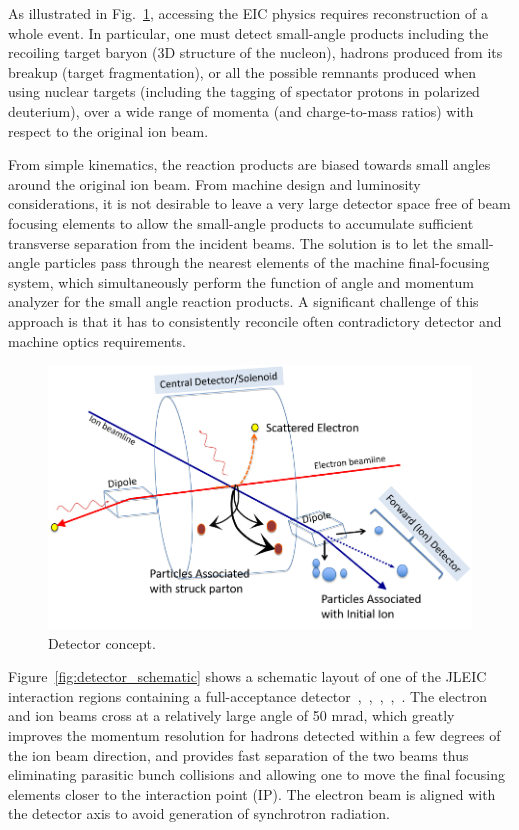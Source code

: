 As illustrated in Fig.~\ref{fig:detector_concept}, accessing the EIC physics requires reconstruction of a whole event. In particular, one must detect small-angle products including the recoiling target baryon (3D structure of the nucleon), hadrons produced from its breakup (target fragmentation), or all the possible remnants produced when using nuclear targets (including the tagging of spectator protons in polarized deuterium), over a wide range of momenta (and charge-to-mass ratios) with respect to the original ion beam.

From simple kinematics, the reaction products are biased towards small angles around the original ion beam. From machine design and luminosity considerations, it is not desirable to leave a very large detector space free of beam focusing elements to allow the small-angle products to accumulate sufficient transverse separation from the incident beams. The solution is to let the small-angle particles pass through the nearest elements of the machine final-focusing system, which simultaneously perform the function of angle and momentum analyzer for the small angle reaction products. A significant challenge of this approach is that it has to consistently reconcile often contradictory detector and machine optics requirements.

\begin{figure}[!htb]
	\centering
	\includegraphics[width=.7\textwidth]{../../img/central_detector.png}
	\caption{Detector concept.}
	\label{fig:detector_concept}
\end{figure}

Figure~\ref{fig:detector_schematic} shows a schematic layout of one of the JLEIC interaction regions containing a full-acceptance detector~\cite{Abeyratne:2012ah},~\cite{Abeyratne:2015pma},~\cite{Lin:2013},~\cite{Morozov:2012},~\cite{Morozov:2014}.  The electron and ion beams cross at a relatively large angle of 50 mrad, which greatly improves the momentum resolution for hadrons detected within a few degrees of the ion beam direction, and provides fast separation of the two beams thus eliminating parasitic bunch collisions and allowing one to move the final focusing elements closer to the interaction point (IP). The electron beam is aligned with the detector axis to avoid generation of synchrotron radiation.


